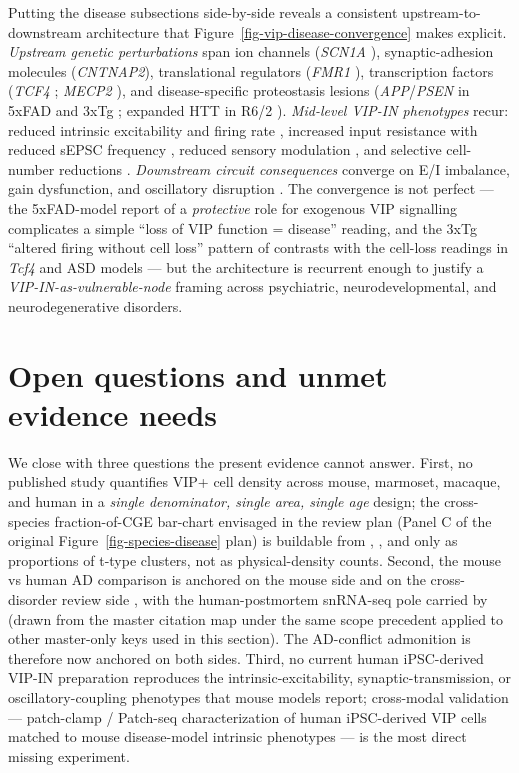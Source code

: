 \documentclass[11pt]{article}
\begin{document}
Putting the disease subsections side-by-side reveals a consistent
upstream-to-downstream architecture that Figure~\ref{fig-vip-disease-convergence}
makes explicit. \textit{Upstream genetic perturbations} span ion channels
(\textit{SCN1A} \citep{Goff2023, Vormsteinschneider2020}), synaptic-adhesion
molecules (\textit{CNTNAP2}), translational regulators
(\textit{FMR1} \citep{Bhandari2024, Rahmatullah2023}), transcription factors
(\textit{TCF4} \citep{Chen2023b}; \textit{MECP2} \citep{Mossner2020, Goff2021, Ferguson2023b}),
and disease-specific proteostasis lesions (\textit{APP}/\textit{PSEN} in 5xFAD and 3xTg
\citep{Michaud2024}; expanded HTT in R6/2
). \textit{Mid-level VIP-IN phenotypes} recur:
reduced intrinsic excitability and firing rate
\citep{Goff2023, Mossner2020}, increased input resistance with reduced
sEPSC frequency \citep{Chen2023b}, reduced sensory modulation
\citep{Rahmatullah2023}, and selective cell-number reductions
\citep{Hanno2026, Chen2023b}. \textit{Downstream circuit consequences} converge
on E/I imbalance, gain dysfunction, and oscillatory disruption
\citep{Mossner2020, Bhandari2024, Batistabrito2017, Kiss2026}.
The convergence is not perfect --- the 5xFAD-model report of a
\textit{protective} role for exogenous VIP signalling complicates a simple
``loss of VIP function = disease'' reading, and the 3xTg
``altered firing without cell loss'' pattern of \citet{Michaud2024}
contrasts with the cell-loss readings in \textit{Tcf4} \citep{Chen2023b} and
ASD models \citep{Hanno2026} --- but the architecture is recurrent
enough to justify a \textit{VIP-IN-as-vulnerable-node} framing across
psychiatric, neurodevelopmental, and neurodegenerative disorders.

\section{Open questions and unmet evidence needs}

We close with three questions the present evidence cannot answer. First,
no published study quantifies VIP+ cell density across mouse, marmoset,
macaque, and human in a \textit{single denominator, single area, single age}
design; the cross-species fraction-of-CGE bar-chart envisaged in the
review plan (Panel C of the original Figure~\ref{fig-species-disease} plan) is
buildable from \citet{Bakken2021a}, \citet{Bakken2021b}, and
\citet{Braininitiativecellcensusnetworkbiccn2021} only as proportions
of t-type clusters, not as physical-density counts. Second, the mouse vs
human AD comparison is anchored on the mouse side
\citep{Michaud2024} and on the cross-disorder review side
\citep{Gil2024}, with the human-postmortem snRNA-seq pole carried by
\citep{Gabitto2024} (drawn from the master citation map
under the same scope precedent applied to other master-only keys
used in this section). The AD-conflict admonition is therefore
now anchored on both sides. Third, no current human
iPSC-derived VIP-IN preparation reproduces the
intrinsic-excitability, synaptic-transmission, or oscillatory-coupling
phenotypes that mouse models report; cross-modal validation ---
patch-clamp / Patch-seq characterization of human iPSC-derived VIP cells
matched to mouse disease-model intrinsic phenotypes --- is the most
direct missing experiment.
\end{document}
